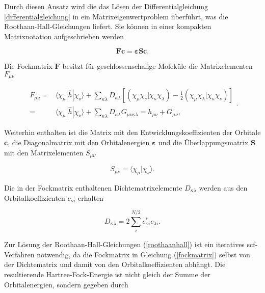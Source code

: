 Durch diesen Ansatz wird die das Lösen der Differentialgleichung \ref{differentialgleichung} in ein Matrixeigenwertproblem überführt, was die Roothaan-Hall-Gleichungen\supercite{roothaanhall} liefert. Sie können in einer kompakten Matrixnotation aufgeschrieben werden

\begin{equation}\label{roothaanhall}
\boldsymbol{Fc}=\boldsymbol{\varepsilon Sc}.
\end{equation}

Die Fockmatrix $\boldsymbol{F}$ besitzt für geschlossenschalige Moleküle die Matrixelementen $F_{\mu\nu}$

\begin{equation}
\begin{aligned}
F_{\mu\nu} =& \langle\chi_{\mu}|\hat{h}|\chi_{\nu}\rangle + \sum_{\kappa\lambda}D_{\kappa\lambda}\left[\left(\chi_{\mu}\chi_{\nu}|\chi_{\kappa}\chi_{\lambda}\right)-\frac{1}{2}\left(\chi_{\mu}\chi_{\lambda}|\chi_{\kappa}\chi_{\nu}\right)\right]\\
=&\langle\chi_{\mu}|\hat{h}|\chi_{\nu}\rangle + \sum_{\kappa\lambda}D_{\kappa\lambda}G_{\mu\nu\kappa\lambda}=h_{\mu\nu}+G_{\mu\nu},
\end{aligned}.
\label{fockmatrix}
\end{equation}

Weiterhin enthalten ist die Matrix mit den Entwicklungskoeffizienten der Orbitale \textbf{c}, die Diagonalmatrix mit den Orbitalenergien $\boldsymbol{\varepsilon}$ und die Überlappungsmatrix $\boldsymbol{S}$ mit den Matrixelementen $S_{\mu\nu}$

\begin{equation}
S_{\mu\nu}=\langle\chi_{\mu}|\chi_{\nu}\rangle.
\end{equation}

Die in der Fockmatrix enthaltenen Dichtematrixelemente $D_{\kappa\lambda}$ werden aus den Orbitalkoeffizienten $c_{\kappa i}$ erhalten

\begin{equation}
D_{\kappa\lambda}=2\sum_{i}^{N/2} c_{\kappa i}^* c_{\lambda i}.
\end{equation}

Zur Lösung der Roothaan-Hall-Gleichungen (\ref{roothaanhall}) ist ein iteratives \ac{scf}-Verfahren notwendig, da die Fockmatrix in Gleichung (\ref{fockmatrix}) selbst von der Dichtematrix und damit von den Orbitalkoeffizienten abhängt. Die resultierende Hartree-Fock-Energie ist nicht gleich der Summe der Orbitalenergien, sondern gegeben durch


